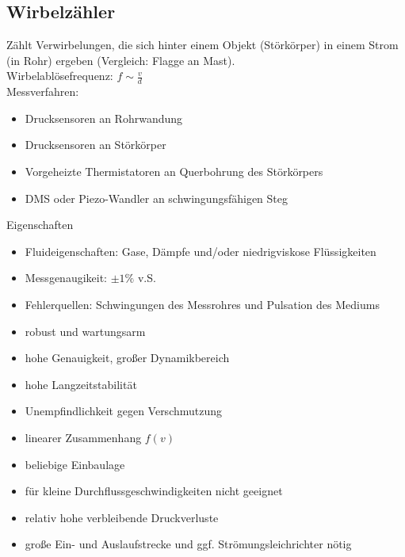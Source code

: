 \subsection{Wirbelzähler}
Zählt Verwirbelungen, die sich hinter einem Objekt (Störkörper) in einem Strom (in Rohr) ergeben (Vergleich: Flagge an Mast).\\
Wirbelablösefrequenz: $f \sim \frac{v}{d}$\\
Messverfahren:
\begin{itemize}
\item Drucksensoren an Rohrwandung
\item Drucksensoren an Störkörper
\item Vorgeheizte Thermistatoren an Querbohrung des Störkörpers
\item DMS oder Piezo-Wandler an schwingungsfähigen Steg
\end{itemize}
Eigenschaften
\begin{itemize}
\item Fluideigenschaften: Gase, Dämpfe und/oder niedrigviskose Flüssigkeiten
\item Messgenaugikeit: $\pm 1 \%$ v.S.
\item Fehlerquellen: Schwingungen des Messrohres und Pulsation des Mediums
\end{itemize}
\begin{itemize}[label=$+$]
\item robust und wartungsarm
\item hohe Genauigkeit, großer Dynamikbereich
\item hohe Langzeitstabilität
\item Unempfindlichkeit gegen Verschmutzung
\item linearer Zusammenhang $f(v)$
\item beliebige Einbaulage
\end{itemize}
\begin{itemize}[label=$-$]
\item für kleine Durchflussgeschwindigkeiten nicht geeignet
\item relativ hohe verbleibende Druckverluste
\item große Ein- und Auslaufstrecke und ggf. Strömungsleichrichter nötig
\end{itemize}

